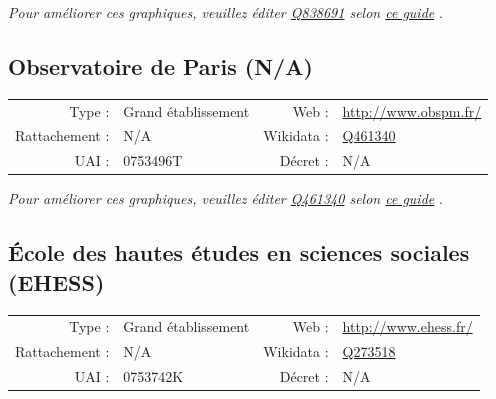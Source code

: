 \documentclass[12pt,french,landscape]{article}
\begin{document}
\textit{\scriptsize Pour améliorer ces graphiques, veuillez éditer \href{https://www.wikidata.org/entity/Q838691}{Q838691}  selon \href{https://github.com/cpesr/wikidataESR/blob/master/Rmd/wikidataESR.md}{ce guide}}
.


\newpage

\hypertarget{observatoire-de-paris-na}{%
\subsection{Observatoire de Paris
(N/A)}\label{observatoire-de-paris-na}}

\begin{tabular*}{0.45\textwidth}{rp{2cm}rl}  
\hline  
Type : & Grand établissement & Web : &\href{http://www.obspm.fr/}{http://www.obspm.fr/} \\  
Rattachement : & N/A & Wikidata : & \href{https://www.wikidata.org/entity/Q461340}{Q461340} \\  
UAI : & 0753496T & Décret : & N/A \\  
\hline  
\end{tabular*}

\textit{\scriptsize Pour améliorer ces graphiques, veuillez éditer \href{https://www.wikidata.org/entity/Q461340}{Q461340}  selon \href{https://github.com/cpesr/wikidataESR/blob/master/Rmd/wikidataESR.md}{ce guide}}
.


\newpage

\hypertarget{uxe9cole-des-hautes-uxe9tudes-en-sciences-sociales-ehess}{%
\subsection{École des hautes études en sciences sociales
(EHESS)}\label{uxe9cole-des-hautes-uxe9tudes-en-sciences-sociales-ehess}}

\begin{tabular*}{0.45\textwidth}{rp{2cm}rl}  
\hline  
Type : & Grand établissement & Web : &\href{http://www.ehess.fr/}{http://www.ehess.fr/} \\  
Rattachement : & N/A & Wikidata : & \href{https://www.wikidata.org/entity/Q273518}{Q273518} \\  
UAI : & 0753742K & Décret : & N/A \\  
\hline  
\end{tabular*}
\end{document}
